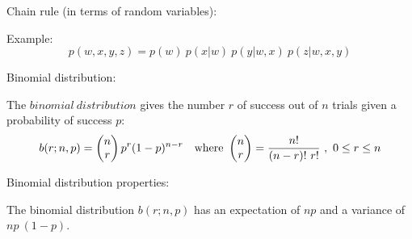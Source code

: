 \documentclass{article}
\begin{document}
Chain rule (in terms of random variables):


Example:
\[
    p(w,x,y,z) = p(w)\ p(x|w)\ p(y|w,x)\ p(z|w,x,y)
\]




Binomial distribution:


The $binomial\ distribution$ gives the number $r$ of success out of $n$ trials given a probability of success $p$:
\[
    b(r; n,p) = \left( \begin{array}{@{}c@{}} n \\ r \end{array} \right) p^r (1-p)^{n-r} \ \ \ \text{where  } \left( \begin{array}{@{}c@{}} n \\ r \end{array} \right) = \frac{n!}{(n-r)!\ r!} \ , \ 0 \leq r \leq n
\]




Binomial distribution properties:


The binomial distribution $b(r;n,p)$ has an expectation of $np$ and a variance of $np\:(1-p)$.
\end{document}
